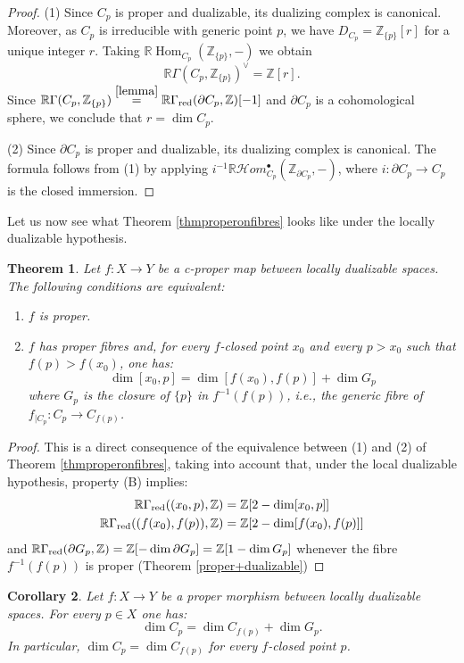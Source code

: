 \documentclass[amssymb,amscd,11pt,20pt]{amsart}
\newcommand{\ZZ}{{\mathbb Z}}
\newcommand{\RR}{\mathbb R}
\newcommand{\0}{\mathbf 0}
\DeclareMathOperator{\Hom}{{Hom}}
\newcommand{\pun}{{\scriptscriptstyle \bullet}}
\newcommand{\HHom}{\mathcal{H}om}
\theoremstyle{plain}
\newtheorem{thm}{Theorem}[section]
\newtheorem{cor}[thm]{Corollary}
\numberwithin{equation}{thm}
\begin{document}
\begin{proof} (1) Since $C_p$ is proper and dualizable, its dualizing complex is canonical. Moreover, as $C_p$ is   irreducible with generic point $p$, we have $D_{C_p}=\ZZ_{\{p\}}[r]$ for a unique integer $r$. Taking $\RR\Hom_{C_p}(\ZZ_{\{p\}},-)$ we obtain
\[ \RR\Gamma(C_p,\ZZ_{\{p\}})^\vee=\ZZ[r].\] Since $\RR\Gamma(C_p,\ZZ_{\{p\}})\overset{\ref{lemma}}=\RR\Gamma_{\text{\rm red}}(\partial C_p,\ZZ)[-1]$ and $\partial C_p$ is a cohomological sphere, we conclude that $r=\dim C_p$.

(2) Since $\partial C_p$ is proper and dualizable, its dualizing complex is canonical. The formula follows from (1) by applying $i^{-1}\RR\HHom_{C_p}^\pun(\ZZ_{\partial C_p},-)$, where $i\colon\partial C_p\to C_p$ is the closed immersion.
\end{proof}

Let us now see what Theorem \ref{thmproperonfibres} looks like under the locally dualizable hypothesis.

\begin{thm}\label{properfibresld} Let $f\colon X\to Y$ be a c-proper map between locally dualizable spaces. The following conditions are equivalent:
\begin{enumerate}\item $f$ is proper.
\item $f$ has proper fibres and, for every $f$-closed point $x_0$ and every $p>x_0$ such that $f(p)> f(x_0)$, one has: 
\[\dim [x_0,p]=\dim [f(x_0),f(p)] + \dim G_p 
\] where $G_p$  is the closure of $\{p\}$ in $f^{-1}(f(p))$, i.e.,  the generic fibre of $f_{\vert C_p}\colon C_p\to C_{f(p)}$.
\end{enumerate}
\end{thm}

\begin{proof} This is a direct  consequence of the equivalence between (1) and (2) of Theorem \ref{thmproperonfibres}, taking into account  that, under the local dualizable hypothesis,   property (B) implies: 
\[ \aligned \RR\Gamma_{\text{\rm red}}((x_0,p),\ZZ)&=\ZZ[2-\dim [x_0,p]]\\  \RR\Gamma_{\text{\rm red}}((f(x_0),f(p)),\ZZ)&=\ZZ[2-\dim [f(x_0),f(p)]]\endaligned\]
and $\RR\Gamma_{\text{\rm red}}(\partial G_p,\ZZ)=\ZZ[-\dim \partial G_p]=\ZZ[1-\dim G_p]$ whenever the fibre $f^{-1}(f(p))$ is proper (Theorem \ref{proper+dualizable})

\end{proof}

\begin{cor}\label{properonvarieties} Let $f\colon X\to Y$ be a proper morphism between locally dualizable spaces. For every $p\in X$ one has:\[ \dim C_p=\dim C_{f(p)}+\dim G_p.\] In particular, $\dim C_p=\dim C_{f(p)}$ for every $f$-closed point $p$. 
\end{cor}
\end{document}
